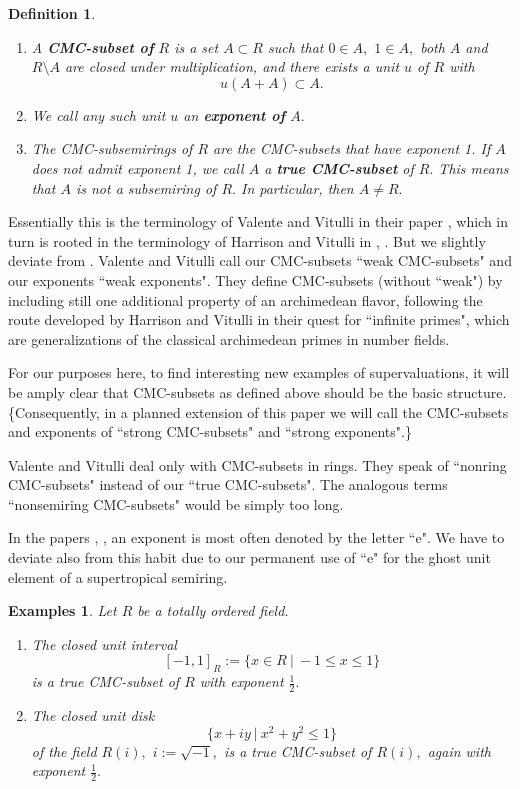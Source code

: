 \documentclass [12pt,a4paper,reqno]{amsart}
\newtheorem{examples}[thm]{Examples}
\newtheorem{defn}[thm]{Definition}
\begin{document}
\begin{defn}\label{defn4.1} $ $
\begin{enumerate}\item[a)]  A {\textbf{{CMC-subset of}}} $R$ is a set
$A\subset R$ such that $0\in A,$ $1\in A,$ both $A$ and
$R\setminus A$ are closed under multiplication, and there exists a
unit $u$ of $R$ with
$$u(A+A)\subset A.$$
\item[b)] We call any such unit $u$ an {\textbf{{exponent of}}} $A.$
\item[c)] The CMC-subsemirings of $R$ are the CMC-subsets that
have exponent 1. If $A$ does not admit exponent 1, we call $A$ a
{\textbf{{true CMC-subset}}} of $R.$ This means that $A$ is not a
subsemiring of $R.$ In particular, then $A\ne
R.$\end{enumerate}\end{defn}

Essentially this is the terminology of Valente and Vitulli in
their paper \cite{VV}, which in turn is rooted in the terminology
of Harrison and Vitulli in \cite{HV1}, \cite{HV2}. But we slightly
deviate from \cite{VV}. Valente and Vitulli call our CMC-subsets
``weak CMC-subsets" and our exponents ``weak exponents". They
define CMC-subsets (without ``weak") by including
 still one additional property of an archimedean flavor,
following the route developed by Harrison and Vitulli in their
quest for ``infinite primes", which are generalizations of the
classical archimedean primes in number fields.

For our purposes here, to find interesting new examples of
supervaluations, it will be amply clear that CMC-subsets as
defined above should be the basic structure. \{Consequently, in a
planned extension of this paper  we will call the CMC-subsets and
exponents of \cite{VV} ``strong CMC-subsets" and ``strong
exponents".\}

Valente and Vitulli deal only with CMC-subsets in rings. They
speak of ``nonring CMC-subsets" instead of our ``true
CMC-subsets". The analogous terms ``nonsemiring CMC-subsets" would
be simply too long.

In the papers \cite{HV2}, \cite{VV}, an exponent is most often
denoted by the letter ``e". We have to deviate also from this
habit due to our permanent use of ``e" for the ghost unit element
of a supertropical semiring.

\begin{examples}\label{examps4.2}
Let $R$ be a totally ordered field.
\begin{enumerate}
    \item[i)] The closed unit interval
$$[-1,1]_R:=\{x\in R {\ {|} \ }-1\le x\le 1\}$$
is a true CMC-subset of $R$ with exponent $\frac{1}{2}.$

\item[ii)] The closed unit disk
$$\{x+iy {\ {|} \ }x^2+y^2\le 1\}$$
of the field $R(i),$ $i:=\sqrt{-1},$ is a true CMC-subset of
$R(i),$ again with exponent $\frac{1}{2}.$
\end{enumerate}
\end{examples}
\end{document}
